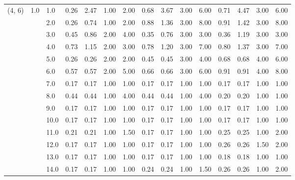 \begin{tabular}{lllrrrrrrrrrrrr}
(4, 6) & 1.0 & 1.0  &       0.26 &      2.47 & 1.00 &   2.00 &       0.68 &      3.67 &  3.00 &   6.00 &       0.71 &      4.47 &  3.00 &   6.00 \\
       &     & 2.0  &       0.26 &      0.74 & 1.00 &   2.00 &       0.88 &      1.36 &  3.00 &   8.00 &       0.91 &      1.42 &  3.00 &   8.00 \\
       &     & 3.0  &       0.45 &      0.86 & 2.00 &   4.00 &       0.35 &      0.76 &  3.00 &   3.00 &       0.36 &      1.19 &  3.00 &   3.00 \\
       &     & 4.0  &       0.73 &      1.15 & 2.00 &   3.00 &       0.78 &      1.20 &  3.00 &   7.00 &       0.80 &      1.37 &  3.00 &   7.00 \\
       &     & 5.0  &       0.26 &      0.26 & 2.00 &   2.00 &       0.45 &      0.45 &  3.00 &   4.00 &       0.68 &      0.68 &  4.00 &   6.00 \\
       &     & 6.0  &       0.57 &      0.57 & 2.00 &   5.00 &       0.66 &      0.66 &  3.00 &   6.00 &       0.91 &      0.91 &  4.00 &   8.00 \\
       &     & 7.0  &       0.17 &      0.17 & 1.00 &   1.00 &       0.17 &      0.17 &  1.00 &   1.00 &       0.17 &      0.17 &  1.00 &   1.00 \\
       &     & 8.0  &       0.44 &      0.44 & 1.00 &   4.00 &       0.44 &      0.44 &  1.00 &   4.00 &       0.20 &      0.20 &  1.00 &   1.00 \\
       &     & 9.0  &       0.17 &      0.17 & 1.00 &   1.00 &       0.17 &      0.17 &  1.00 &   1.00 &       0.17 &      0.17 &  1.00 &   1.00 \\
       &     & 10.0 &       0.17 &      0.17 & 1.00 &   1.00 &       0.17 &      0.17 &  1.00 &   1.00 &       0.17 &      0.17 &  1.00 &   1.00 \\
       &     & 11.0 &       0.21 &      0.21 & 1.00 &   1.50 &       0.17 &      0.17 &  1.00 &   1.00 &       0.25 &      0.25 &  1.00 &   2.00 \\
       &     & 12.0 &       0.17 &      0.17 & 1.00 &   1.00 &       0.17 &      0.17 &  1.00 &   1.00 &       0.26 &      0.26 &  1.50 &   2.00 \\
       &     & 13.0 &       0.17 &      0.17 & 1.00 &   1.00 &       0.17 &      0.17 &  1.00 &   1.00 &       0.18 &      0.18 &  1.00 &   1.00 \\
       &     & 14.0 &       0.17 &      0.17 & 1.00 &   1.00 &       0.24 &      0.24 &  1.00 &   1.50 &       0.26 &      0.26 &  1.00 &   2.00 \\

\end{tabular}
